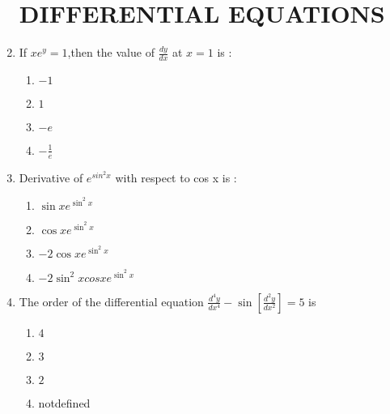 \documentclass{article}
\begin{document}
				\begin{enumerate}
						\section{DIFFERENTIAL EQUATIONS}
						    \item If $xe^{y}=1$,then the value of $\frac{dy}{dx}$ at $x = 1$ is :
                \begin{enumerate}[label=(\Alph*)]
                        \item $-1$
                        \item $1$
                        \item $-e$
                        \item $-\frac{1}{e}$
                \end{enumerate}
                        \item Derivative of $e^{sin^2x}$ with respect to cos x is :
                                \begin{enumerate}[label=(\Alph*)]
                                        \item $\sin x  e^{\sin^2x}$
                                        \item $\cos x  e^{\sin^2x}$
                                        \item $-2\cos x e^{\sin^2x}$
                                        \item $-2\sin^2 x cos x  e^{\sin^2x}$
                                \end{enumerate}
                        \item The order of the differential equation $\frac{d^4y}{dx^4} - \sin[\frac{d^2y}{dx^2}]=5$ is
                                \begin{enumerate}[label=(\Alph*)]

                                        \item $4$
                                        \item $3$
                                        \item $2$
                                        \item notdefined
				\end{enumerate}
				\end{enumerate}
				
\end{document}
